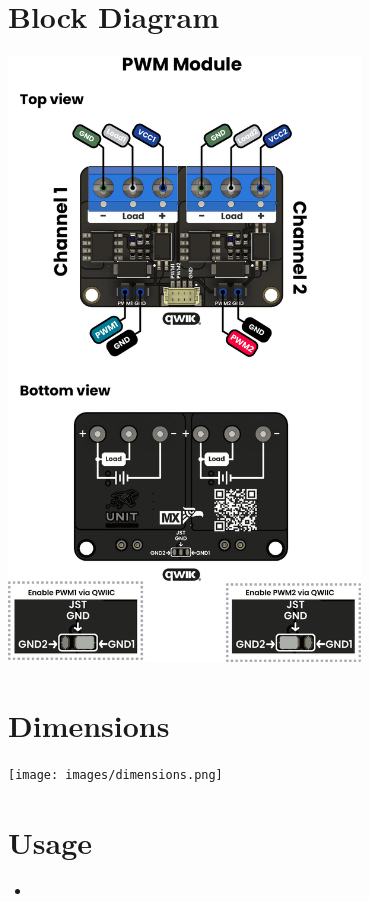\documentclass[10pt]{article}
\begin{document}
\FloatBarrier
\newpage
\vspace*{3em}
\section*{Block Diagram}
\vspace{1em}
\begin{center}
\includegraphics[width=0.70\textwidth,keepaspectratio]{images/function-diagram.jpg}
\end{center}
\newpage
\vspace*{3em}
\section*{Dimensions}
\vspace{1em}
\begin{center}
\texttt{[image: images/dimensions.png]}
\end{center}



\section*{Usage}
\begin{itemize}
\item 
\end{itemize}
\end{document}
